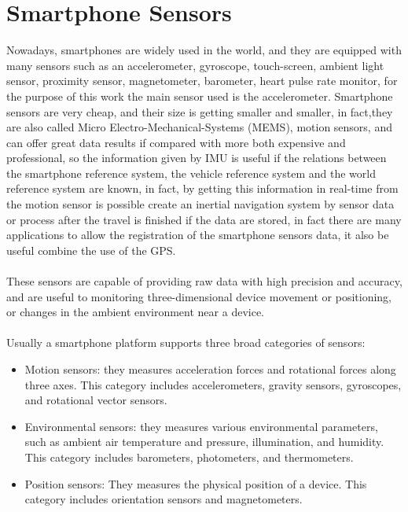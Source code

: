 \documentclass{standalone}
\begin{document}
\section{Smartphone Sensors}\label{Smartphone Sensors}
Nowadays, smartphones are widely used in the world, and they are equipped with many sensors such as an accelerometer, gyroscope, touch-screen, ambient light sensor, proximity sensor, magnetometer, barometer, heart pulse rate monitor, for the purpose of this work the main sensor used is the accelerometer. Smartphone sensors are very cheap, and their size is getting smaller and smaller, in fact,they are also called Micro Electro-Mechanical-Systems (MEMS), motion sensors, and can offer great data results if compared with more both expensive and professional, so the information given by IMU is useful if the relations between the smartphone reference system, the vehicle reference system and the world reference system are known, in fact, by getting this information in real-time from the motion sensor is possible create an inertial navigation system by sensor data or process after the travel is finished if the data are stored, in fact there are many applications to allow the registration of the smartphone sensors data, it also be useful combine the use of the GPS.\\\\

\noindent These sensors are capable of providing raw data with high precision and accuracy, and are useful to monitoring three-dimensional device movement or positioning, or changes in the ambient environment near a device.\\\\
Usually a smartphone platform supports three broad categories of sensors:\cite{Andro}
\begin{itemize}
	\item Motion sensors: they measures acceleration forces and rotational forces along three axes. This category includes accelerometers, gravity sensors, gyroscopes, and rotational vector sensors.
	\item Environmental sensors: they measures various environmental parameters, such as ambient air temperature and pressure, illumination, and humidity. This category includes barometers, photometers, and thermometers.
	\item Position sensors: They measures the physical position of a device. This category includes orientation sensors and magnetometers.
\end{itemize}
\end{document}
